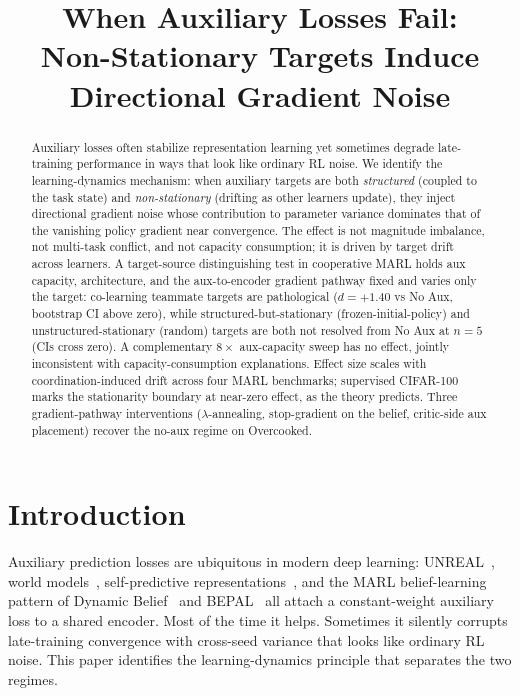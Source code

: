 \documentclass{article}
\title{When Auxiliary Losses Fail:\\
Non-Stationary Targets Induce Directional Gradient Noise}
\theoremstyle{plain}
\theoremstyle{definition}
\theoremstyle{remark}
\begin{document}
\maketitle

\begin{abstract}
Auxiliary losses often stabilize representation learning yet
sometimes degrade late-training performance in ways that look like
ordinary RL noise. We identify the learning-dynamics mechanism: when
auxiliary targets are both \emph{structured} (coupled to the task
state) and \emph{non-stationary} (drifting as other learners update),
they inject directional gradient noise whose contribution to
parameter variance dominates that of the vanishing policy gradient
near convergence. The effect is not magnitude imbalance, not
multi-task conflict, and not capacity consumption; it is driven by
target drift across learners. A target-source distinguishing test
in cooperative MARL holds aux capacity, architecture, and the
aux-to-encoder gradient pathway fixed and varies only the target:
co-learning teammate targets are pathological ($d = +1.40$ vs No
Aux, bootstrap CI above zero), while structured-but-stationary
(frozen-initial-policy) and unstructured-stationary (random) targets
are both not resolved from No Aux at $n{=}5$ (CIs cross zero). A
complementary $8\times$ aux-capacity sweep has no effect, jointly
inconsistent with capacity-consumption explanations. Effect size
scales with coordination-induced drift across four MARL benchmarks;
supervised CIFAR-100 marks the stationarity boundary at near-zero
effect, as the theory predicts. Three gradient-pathway interventions
($\lambda$-annealing, stop-gradient on the belief, critic-side aux
placement) recover the no-aux regime on Overcooked.
\end{abstract}


\section{Introduction}
\label{sec:intro}

Auxiliary prediction losses are ubiquitous in modern deep learning:
UNREAL~\cite{jaderberg2016reinforcement}, world
models~\cite{hafner2023mastering}, self-predictive
representations~\cite{schwarzer2021dataefficient}, and the MARL
belief-learning pattern of Dynamic Belief~\cite{zhai2023dynamic} and
BEPAL~\cite{huang2025bepal} all attach a constant-weight auxiliary
loss to a shared encoder. Most of the time it helps. Sometimes it
silently corrupts late-training convergence with cross-seed variance
that looks like ordinary RL noise. This paper identifies the
learning-dynamics principle that separates the two regimes.
\end{document}
